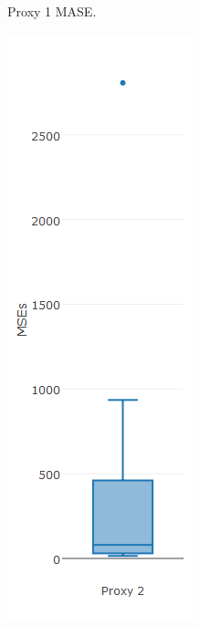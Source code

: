 \begin{figure}[!h]
{\begin{subfigure}{.25\linewidth}
  \caption{Proxy 1 MASE.}
  \label{fig:bp2.2}
\end{subfigure}
\begin{subfigure}{.25\linewidth}
  \centering
  \includegraphics[width=\linewidth]{img/10ymaMsebp.png}

\end{subfigure}}
\end{figure}
